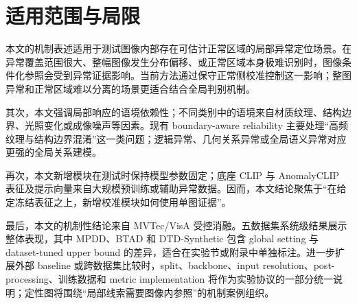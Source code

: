 \section{适用范围与局限}

本文的机制表述适用于测试图像内部存在可估计正常区域的局部异常定位场景。在异常覆盖范围很大、整幅图像发生分布偏移、或正常区域本身极难识别时，图像条件化参照会受到异常证据影响。当前方法通过保守正常侧校准控制这一影响；整图异常和正常区域难以分离的场景更适合结合全局判别机制。

其次，本文强调局部响应的语境依赖性；不同类别中的语境来自材质纹理、结构边界、光照变化或成像噪声等因素。现有 boundary-aware reliability 主要处理“高频纹理与结构边界混淆”这一类问题；逻辑异常、几何关系异常或全局语义异常对应更强的全局关系建模。

再次，本文新增模块在测试时保持模型参数固定；底座 CLIP 与 AnomalyCLIP 表征及提示向量来自大规模预训练或辅助异常数据。因而，本文结论聚焦于“在给定冻结表征之上，新增校准模块如何使用单图证据”。

最后，本文的机制性结论来自 MVTec/VisA 受控消融。五数据集系统级结果展示整体表现，其中 MPDD、BTAD 和 DTD-Synthetic 包含 global setting 与 dataset-tuned upper bound 的差异，适合在实验节或附录中单独标注。进一步扩展外部 baseline 或跨数据集比较时，split、backbone、input resolution、post-processing、训练数据和 metric implementation 将作为实验协议的一部分统一说明；定性图将围绕“局部线索需要图像内参照”的机制案例组织。

